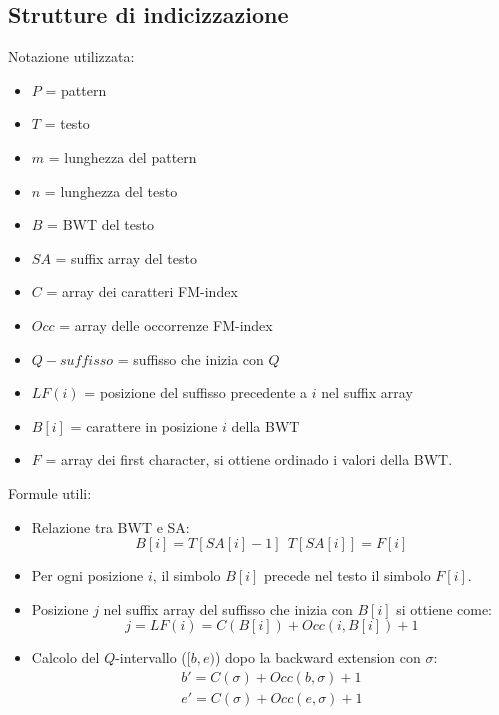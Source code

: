 \subsection{Strutture di indicizzazione}
Notazione utilizzata:
\begin{itemize}
    \item $P$ = pattern
    \item $T$ = testo
    \item $m$ = lunghezza del pattern
    \item $n$ = lunghezza del testo
    \item $B$ = BWT del testo
    \item $SA$ = suffix array del testo
    \item $C$ = array dei caratteri FM-index
    \item $Occ$ = array delle occorrenze FM-index
    \item $Q-suffisso$ = suffisso che inizia con $Q$
    \item $LF(i)$ = posizione del suffisso precedente a $i$ nel suffix array
    \item $B[i]$ = carattere in posizione $i$ della BWT
    \item $F$ = array dei first character, si ottiene ordinado i valori della BWT.
\end{itemize}
Formule utili:
\begin{itemize}
    \item Relazione tra BWT e SA:
          \begin{equation}
              B[i] = T[SA[i] - 1] \ \ T[SA[i]] = F[i]
          \end{equation}
    \item Per ogni posizione $i$, il simbolo $B[i]$ precede nel testo il simbolo $F[i]$.
    \item Posizione $j$ nel suffix array del suffisso che inizia con $B[i]$ si ottiene come:
          \begin{equation}
              j = LF(i) = C(B[i]) + Occ(i, B[i]) + 1
          \end{equation}
    \item Calcolo del $Q$-intervallo ($[b, e)$) dopo la backward extension con
          $\sigma$:
          \begin{equation}
              \begin{array}{l}
                  b' = C(\sigma) + Occ(b, \sigma) + 1 \\
                  e' = C(\sigma) + Occ(e, \sigma) + 1
              \end{array}
          \end{equation}
\end{itemize}
